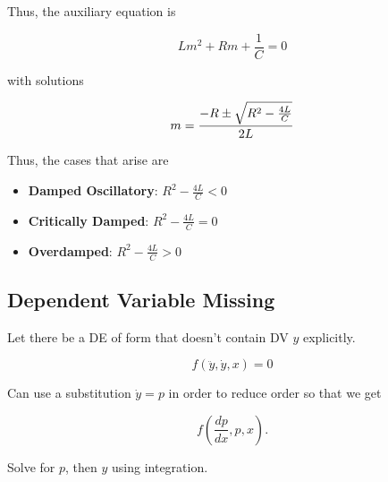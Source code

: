 Thus, the auxiliary equation is

\begin{equation}
    Lm^2+Rm+\frac{1}{C}=0
\end{equation}

with solutions

\begin{equation}
    m=\frac{-R\pm \sqrt{R^2-\frac{4L}{C}}}{2L}\\
\end{equation}

Thus, the cases that arise are
\begin{itemize}
    \item \textbf{Damped Oscillatory}: $R^2-\frac{4L}{C}<0$
    \item \textbf{Critically Damped}: $R^2-\frac{4L}{C}=0$
    \item \textbf{Overdamped}: $R^2-\frac{4L}{C}>0$
\end{itemize}

\subsection{Dependent Variable Missing}

Let there be a DE of form that doesn't contain DV $y$ explicitly.

\begin{equation}
    f(\ddot y,\dot y,x)=0
\end{equation}

Can use a substitution $\dot y= p$ in order to reduce order so that we get

\begin{equation}
    f(\frac{dp}{dx}, p,x).
\end{equation}

Solve for $p$, then $y$ using integration.